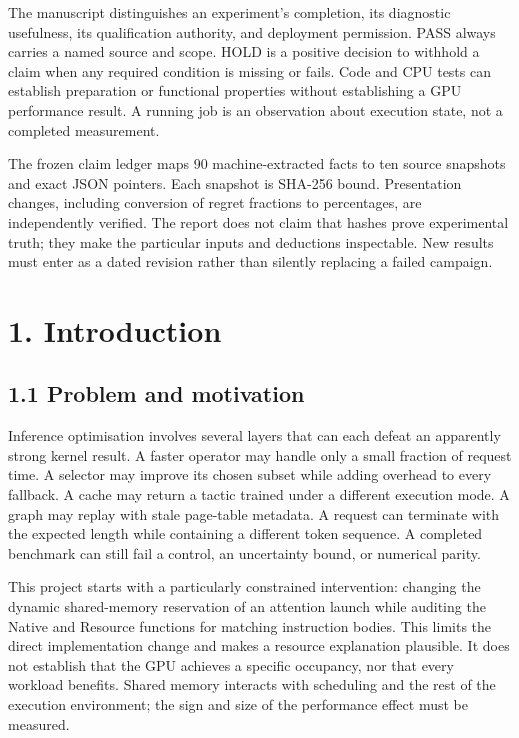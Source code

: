 \documentclass[11pt,a4paper]{article}
\begin{document}
The manuscript distinguishes an experiment's completion, its diagnostic usefulness, its qualification authority, and deployment permission. PASS always carries a named source and scope. HOLD is a positive decision to withhold a claim when any required condition is missing or fails. Code and CPU tests can establish preparation or functional properties without establishing a GPU performance result. A running job is an observation about execution state, not a completed measurement.


The frozen claim ledger maps 90 machine-extracted facts to ten source snapshots and exact JSON pointers. Each snapshot is SHA-256 bound. Presentation changes, including conversion of regret fractions to percentages, are independently verified. The report does not claim that hashes prove experimental truth; they make the particular inputs and deductions inspectable. New results must enter as a dated revision rather than silently replacing a failed campaign.


\clearpage

\section*{1. Introduction}


\subsection*{1.1 Problem and motivation}

Inference optimisation involves several layers that can each defeat an apparently strong kernel result. A faster operator may handle only a small fraction of request time. A selector may improve its chosen subset while adding overhead to every fallback. A cache may return a tactic trained under a different execution mode. A graph may replay with stale page-table metadata. A request can terminate with the expected length while containing a different token sequence. A completed benchmark can still fail a control, an uncertainty bound, or numerical parity.


This project starts with a particularly constrained intervention: changing the dynamic shared-memory reservation of an attention launch while auditing the Native and Resource functions for matching instruction bodies. This limits the direct implementation change and makes a resource explanation plausible. It does not establish that the GPU achieves a specific occupancy, nor that every workload benefits. Shared memory interacts with scheduling and the rest of the execution environment; the sign and size of the performance effect must be measured.
\end{document}
